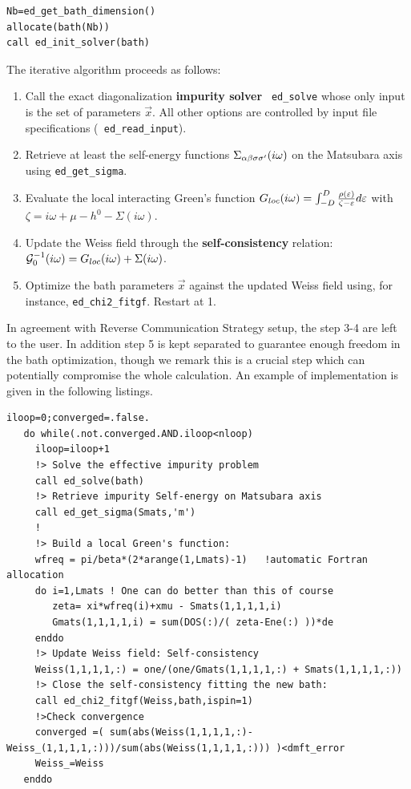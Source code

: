 \begin{lstlisting}[style=fstyle,numbers=none,basicstyle={\scriptsize\ttfamily}]
Nb=ed_get_bath_dimension()
allocate(bath(Nb))
call ed_init_solver(bath)
\end{lstlisting}








The iterative algorithm proceeds as follows:
\begin{enumerate}
\item Call the exact diagonalization {\bf impurity solver} {\tt
    ed\_solve} whose only input is the set of parameters $\vec{x}$. All other
  options are controlled by input file specifications ({\tt
    ed\_read\_input}).
\item Retrieve at least the self-energy functions $\Sigma_{\alpha\beta\sigma\sigma'}(i\omega)$ on the
  Matsubara axis using {\tt ed\_get\_sigma}.
\item Evaluate the local interacting Green's function
  $G_{loc}(i\omega) = \int_{-D}^D \frac{\rho(\varepsilon)}{\zeta -\varepsilon}d\varepsilon$ with
  $\zeta=i\omega+\mu-h^0-\Sigma(i\omega)$.
  \item Update the Weiss field through the {\bf self-consistency}
    relation: ${\cal G}^{-1}_0(i\omega) = G_{loc}(i\omega) + \Sigma(i\omega)$. 
  \item Optimize the bath parameters $\vec{x}$ against the updated
    Weiss field using, for instance, {\tt ed\_chi2\_fitgf}. Restart at 1.
\end{enumerate}
In agreement with Reverse Communication Strategy setup, the step 3-4
are left to the user. In addition step 5 is kept separated to
guarantee enough freedom in the bath optimization, though we remark
this is a crucial step which can potentially compromise the whole
calculation.
An example of implementation is given in the following listings.

\begin{lstlisting}[style=fstyle,numbers=none,basicstyle={\scriptsize\ttfamily}]
iloop=0;converged=.false.
   do while(.not.converged.AND.iloop<nloop)
     iloop=iloop+1     
     !> Solve the effective impurity problem
     call ed_solve(bath)     
     !> Retrieve impurity Self-energy on Matsubara axis
     call ed_get_sigma(Smats,'m')
     !
     !> Build a local Green's function:
     wfreq = pi/beta*(2*arange(1,Lmats)-1)   !automatic Fortran allocation
     do i=1,Lmats ! One can do better than this of course 
        zeta= xi*wfreq(i)+xmu - Smats(1,1,1,1,i)
        Gmats(1,1,1,1,i) = sum(DOS(:)/( zeta-Ene(:) ))*de  
     enddo
     !> Update Weiss field: Self-consistency
     Weiss(1,1,1,1,:) = one/(one/Gmats(1,1,1,1,:) + Smats(1,1,1,1,:))
     !> Close the self-consistency fitting the new bath:
     call ed_chi2_fitgf(Weiss,bath,ispin=1)     
     !>Check convergence
     converged =( sum(abs(Weiss(1,1,1,1,:)-Weiss_(1,1,1,1,:)))/sum(abs(Weiss(1,1,1,1,:))) )<dmft_error
     Weiss_=Weiss     
   enddo
\end{lstlisting}



